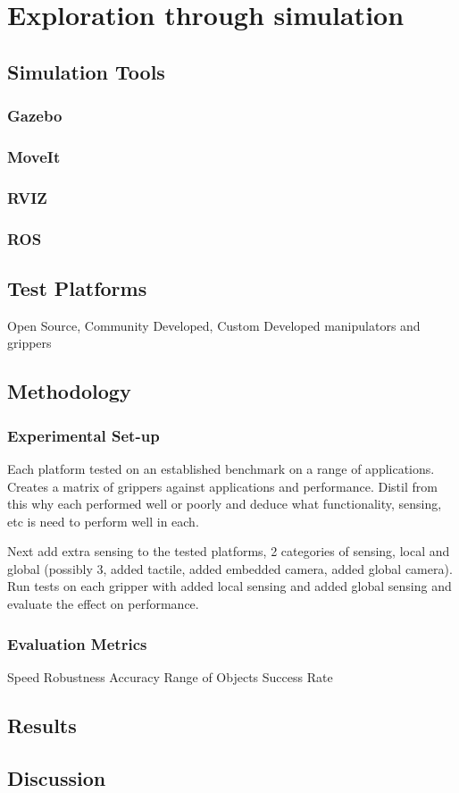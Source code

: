 \chapter{Exploration through simulation}

\section{Simulation Tools}

\subsection{Gazebo}
\subsection{MoveIt}
\subsection{RVIZ}
\subsection{ROS}

\section{Test Platforms}
Open Source, Community Developed, Custom Developed manipulators and grippers

\section{Methodology}
\subsection{Experimental Set-up}

Each platform tested on an established benchmark on a range of applications.
Creates a matrix of grippers against applications and performance.
Distil from this why each performed well or poorly and deduce what functionality, sensing, etc is need to perform well in each.

Next add extra sensing to the tested platforms, 2 categories of sensing, local and global (possibly 3, added tactile, added embedded camera, added global camera). Run tests on each gripper with added local sensing and added global sensing and evaluate the effect on performance.

\subsection{Evaluation Metrics}
Speed
Robustness
Accuracy
Range of Objects
Success Rate

\section{Results}


\section{Discussion}







